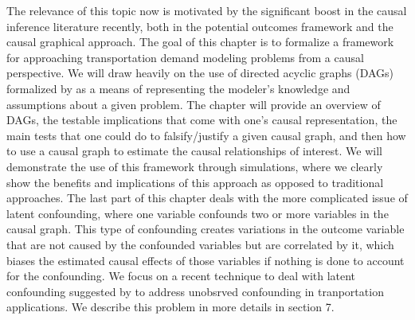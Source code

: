 The relevance of this topic now is motivated by the significant boost in the causal inference literature recently, both in the potential outcomes framework and the causal graphical approach.
The goal of this chapter is to formalize a framework for approaching 
transportation demand modeling problems from a causal perspective. 
We will draw heavily on the use of directed acyclic graphs (DAGs) formalized by \citet{pearl_causality_2000} as a means of representing the modeler's knowledge and assumptions about a given problem. 
The chapter will provide an overview of DAGs, the 
testable implications that come with one's causal representation, the main 
tests that one could do to falsify/justify a given causal graph, and then how 
to use a causal graph to estimate the causal relationships of interest. 
We will demonstrate the use of this framework through simulations, where we 
clearly show the benefits and implications of this approach as opposed to 
traditional approaches. 
The last part of this chapter deals with the more complicated issue of latent 
confounding, where one variable confounds two or more variables in the causal 
graph. This type of confounding creates variations in the outcome variable that are not caused by 
the confounded variables but are correlated by it, which biases the estimated 
causal effects of those variables if nothing is done to account for the 
confounding. 
We focus on a recent technique to deal with latent confounding suggested by \citet{wang_2019_blessings} to address unobsrved confounding in tranportation applications. 
We describe this problem in more details in section 7.



